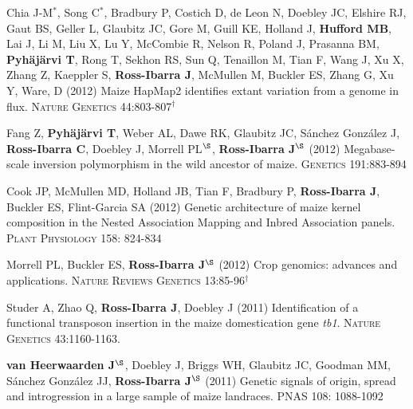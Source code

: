 \documentclass[letterpaper]{article}
\begin{document}
\begin{etaremune}
\vspace{-2ex}
\item  Chia J-M$^*$, Song C$^*$, Bradbury P, Costich D, de Leon N, Doebley JC, Elshire RJ, Gaut BS, Geller L, Glaubitz JC, Gore M, Guill KE, Holland J,  {\bf Hufford MB}, Lai J, Li M, Liu X, Lu Y, McCombie R, Nelson R, Poland J, Prasanna BM,  {\bf Pyh\"aj\"arvi T}, Rong T, Sekhon RS,  Sun Q, Tenaillon M, Tian F, Wang J, Xu X, Zhang Z, Kaeppler S, {\bf Ross-Ibarra J}, McMullen M, Buckler ES, Zhang G, Xu Y, Ware, D (2012) Maize HapMap2 identifies extant variation from a genome in flux. \textsc{Nature Genetics} 44:803-807$^\dagger$

\vspace{-2ex}
\item Fang Z, {\bf Pyh\"aj\"arvi T}, Weber AL, Dawe RK, Glaubitz JC, S\'{a}nchez Gonz\'{a}lez J, {\bf Ross-Ibarra C}, Doebley J, Morrell PL$^\S$, {\bf Ross-Ibarra J}$^\S$  (2012) Megabase-scale inversion polymorphism in the wild ancestor of maize. \textsc{Genetics} 191:883-894 

\vspace{-2ex}
\item Cook JP, McMullen MD, Holland JB, Tian F, Bradbury P, {\bf Ross-Ibarra J}, Buckler ES, Flint-Garcia SA (2012) Genetic architecture of maize kernel composition in the Nested Association Mapping and Inbred Association panels.  \textsc{Plant Physiology} 158: 824-834

\vspace{-2ex}
\item Morrell PL, Buckler ES, {\bf Ross-Ibarra J}$^\S$ (2012) Crop genomics: advances and applications.  \textsc{Nature Reviews Genetics} 13:85-96$^\dagger$

\vspace{-2ex}
\item Studer A, Zhao Q, {\bf Ross-Ibarra J}, Doebley J (2011) Identification of a functional transposon insertion in the maize domestication gene \emph{tb1}.  \textsc{Nature Genetics} 43:1160-1163.

\vspace{-2ex}
\item {\bf van Heerwaarden J}$^\S$, Doebley J, Briggs WH, Glaubitz JC, Goodman MM, S\'{a}nchez Gonz\'{a}lez JJ, {\bf Ross-Ibarra J}$^\S$ (2011) Genetic signals of origin, spread and introgression in a large sample of maize landraces. PNAS 108: 1088-1092


\end{etaremune}
\end{document}
